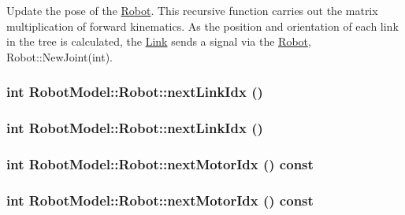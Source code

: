 Update the pose of the \hyperlink{class_robot_model_1_1_robot}{Robot}. This recursive function carries out the matrix multiplication of forward kinematics. As the position and orientation of each link in the tree is calculated, the \hyperlink{class_robot_model_1_1_link}{Link} sends a signal via the \hyperlink{class_robot_model_1_1_robot}{Robot}, Robot::NewJoint(int). \hypertarget{class_robot_model_1_1_robot_a465bb3898172af37d6dec1885da0fec0}{
\subsubsection[{nextLinkIdx}]{\setlength{\rightskip}{0pt plus 5cm}int RobotModel::Robot::nextLinkIdx ()}}
\label{class_robot_model_1_1_robot_a465bb3898172af37d6dec1885da0fec0}
\hypertarget{class_robot_model_1_1_robot_a465bb3898172af37d6dec1885da0fec0}{
\subsubsection[{nextLinkIdx}]{\setlength{\rightskip}{0pt plus 5cm}int RobotModel::Robot::nextLinkIdx ()}}
\label{class_robot_model_1_1_robot_a465bb3898172af37d6dec1885da0fec0}
\hypertarget{class_robot_model_1_1_robot_ac9919cc40764e47d97fa591018bfbe67}{
\subsubsection[{nextMotorIdx}]{\setlength{\rightskip}{0pt plus 5cm}int RobotModel::Robot::nextMotorIdx () const}}
\label{class_robot_model_1_1_robot_ac9919cc40764e47d97fa591018bfbe67}
\hypertarget{class_robot_model_1_1_robot_ac9919cc40764e47d97fa591018bfbe67}{
\subsubsection[{nextMotorIdx}]{\setlength{\rightskip}{0pt plus 5cm}int RobotModel::Robot::nextMotorIdx () const}}
